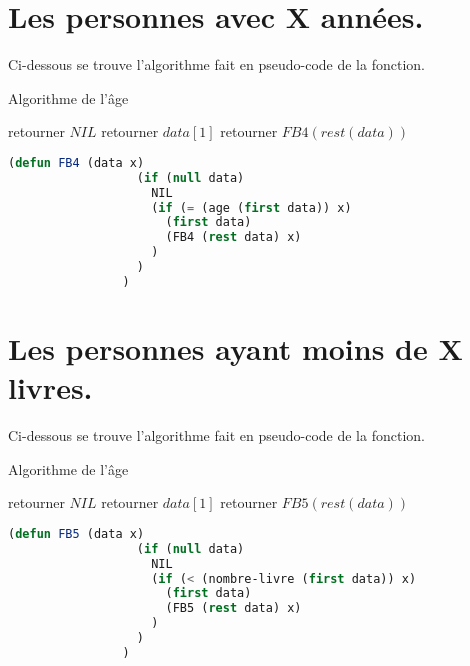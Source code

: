 \documentclass[a4paper, 12pt, leqno]{report}
\theoremstyle{plain}
\begin{document}
            \section{Les personnes avec X années.}
        Ci-dessous se trouve l'algorithme fait en pseudo-code de la fonction.
        \begin{algorithm}
            \caption{Algorithme de l'âge}
            \begin{algorithmic}
                    \State retourner $NIL$
                    \State retourner $data[1]$
                \Else
                    \State retourner $FB4(rest (data))$    
                \EndIf      
            \end{algorithmic}
            \end{algorithm}
            \begin{lstlisting}[label=some-code,caption=FB4(data X),language=lisp]
                (defun FB4 (data x) 
                  (if (null data) 
                    NIL
	                (if (= (age (first data)) x) 
	                  (first data) 
	                  (FB4 (rest data) x)
	                )
	              )
                )
            \end{lstlisting} 
            \newpage  
            
       \section{Les personnes ayant moins de X livres.}
        Ci-dessous se trouve l'algorithme fait en pseudo-code de la fonction.
        \begin{algorithm}
            \caption{Algorithme de l'âge}
            \begin{algorithmic}
                    \State retourner $NIL$
                    \State retourner $data[1]$
                \Else
                    \State retourner $FB5(rest (data))$    
                \EndIf      
            \end{algorithmic}
            \end{algorithm}
            \begin{lstlisting}[label=some-code,caption=FB5(data X),language=lisp]
                (defun FB5 (data x) 
                  (if (null data) 
                    NIL
	                (if (< (nombre-livre (first data)) x) 
	                  (first data) 
	                  (FB5 (rest data) x)
	                )
	              )
                )
            \end{lstlisting}       
            
\end{document}
